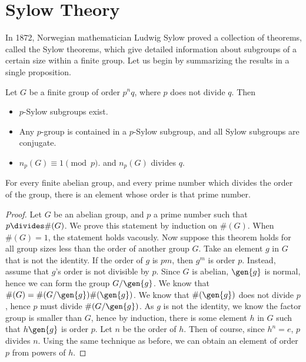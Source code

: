 \section{Sylow Theory}

In 1872, Norwegian mathematician Ludwig Sylow proved a collection of theorems, called the Sylow theorems, which give detailed information about subgroups of a certain size within a finite group. Let us begin by summarizing the results in a single proposition.

\begin{theorem}
    Let $G$ be a finite group of order $p^n q$, where $p$ does not divide $q$. Then
    \begin{itemize}
        \item $p$-Sylow subgroups exist.
        \item Any $p$-group is contained in a $p$-Sylow subgroup, and all Sylow subgroups are conjugate.
        \item $n_p(G) \equiv 1 \pmod{p}$. and $n_p(G)$ divides $q$.
    \end{itemize}
\end{theorem}

\begin{theorem}
    For every finite abelian group, and every prime number which divides the order of the group, there is an element whose order is that prime number.
\end{theorem}
\begin{proof}
    Let $G$ be an abelian group, and $p$ a prime number such that $p \divides \#(G)$. We prove this statement by induction on $\#(G)$. When $\#(G) = 1$, the statement holds vacously. Now suppose this theorem holds for all group sizes less than the order of another group $G$. Take an element $g$ in $G$ that is not the identity. If the order of $g$ is $pm$, then $g^m$ is order $p$. Instead, assume that $g$'s order is not divisible by $p$. Since $G$ is abelian, $\gen{g}$ is normal, hence we can form the group $G/\gen{g}$. We know that $\#(G) = \#(G/\gen{g}) \#(\gen{g})$. We know that $\#(\gen{g})$ does not divide $p$, hence $p$ must divide $\#(G/\gen{g})$. As $g$ is not the identity, we know the factor group is smaller than $G$, hence by induction, there is some element $h$ in $G$ such that $h \gen{g}$ is order $p$. Let $n$ be the order of $h$. Then of course, since $h^n = e$, $p$ divides $n$. Using the same technique as before, we can obtain an element of order $p$ from powers of $h$.
\end{proof}

